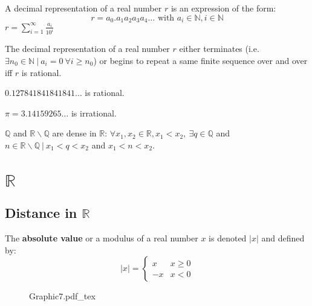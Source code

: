 \documentclass[12pt, a4paper]{book}
\newcommand{\incfig}[1]{%
\def\svgscale{1}
{#1.pdf_tex}
}
\begin{document}
\begin{defn}
  A decimal representation of a real number $r$ is an expression of the form:
  \[
    r = a_0. a_1 a_2 a_3 a_4 \ldots \text{ with } a_i \in\mathbb{N}, i\in\mathbb{N}
  \]
  $\displaystyle r = \sum_{i = 1}^{\infty} \frac{a_i}{10^i} $
\end{defn}

\begin{prop}
  The decimal representation of a real number $r$ either terminates (i.e. $\exists n_0\in\mathbb{N}\ \vert\ a_i=0\ \forall i \geq n_0$) or begins to repeat a same finite sequence over and over iff $r$ is rational.
\end{prop}

\begin{exmp}
  $0.127841841841841\ldots$ is rational.

  $\pi = 3.14159265\ldots$ is irrational.
\end{exmp}

\begin{prop}
  $\mathbb{Q}$ and $\mathbb{R}\backslash\mathbb{Q}$ are dense in $\mathbb{R}$: $\forall x_1,x_2 \in\mathbb{R}, x_1<x_2,\ \exists q\in\mathbb{Q}$ and $n\in\mathbb{R}\backslash\mathbb{Q}\ \vert\ x_1<q<x_2$ and $x_1<n<x_2$.
\end{prop}

\section{$\mathbb{R}$}

\subsection*{Distance in $\mathbb{R}$}

\begin{defn}
  The \textbf{absolute value} or a modulus of a real number $x$ is denoted $|x|$ and defined by:
  \[
    |x| = \begin{cases}
      x &x\geq 0 \\
      -x &x<0
    \end{cases}
  \]
\end{defn}

\begin{figure}[H]
  \centering
  \incfig{Graphic7}
\end{figure}
\end{document}
